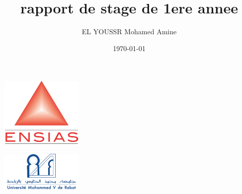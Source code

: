 \documentclass[12pt,a4paper,twoside]{report}
\begin{document}
	\thispagestyle{empty}
	\makeatother
	\title{rapport de stage de 1ere annee}
	\author{EL YOUSSR Mohamed Amine}
	\date{\today}


	\lstset{ numbers=left, tabsize=3, frame=single, numberstyle=\ttfamily, basicstyle=\footnotesize} 
	\begin{minipage}[l]{.10\linewidth}
			\begin{center}
				\includegraphics[width=4cm]{Images/logo/ensias.png}
			\end{center}
	\end{minipage} \hfill
	\begin{minipage}[r]{.36\linewidth}
			\begin{center}
				\includegraphics[width=4cm]{Images/logo/um5.png}
			\end{center}
	\end{minipage}
	
	\vspace{1.5cm}
	
\end{document}
